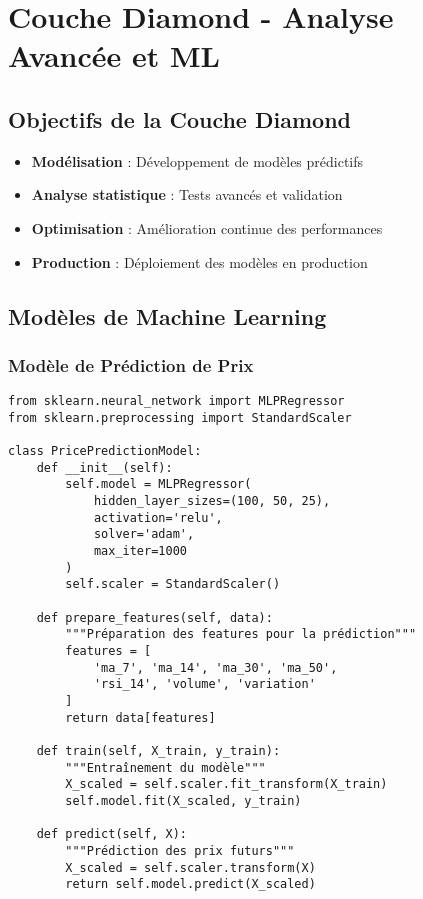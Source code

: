 \section{Couche Diamond - Analyse Avancée et ML}

\subsection{Objectifs de la Couche Diamond}

\begin{itemize}
    \item \textbf{Modélisation} : Développement de modèles prédictifs
    \item \textbf{Analyse statistique} : Tests avancés et validation
    \item \textbf{Optimisation} : Amélioration continue des performances
    \item \textbf{Production} : Déploiement des modèles en production
\end{itemize}

\subsection{Modèles de Machine Learning}

\subsubsection{Modèle de Prédiction de Prix}

\begin{verbatim}
from sklearn.neural_network import MLPRegressor
from sklearn.preprocessing import StandardScaler

class PricePredictionModel:
    def __init__(self):
        self.model = MLPRegressor(
            hidden_layer_sizes=(100, 50, 25),
            activation='relu',
            solver='adam',
            max_iter=1000
        )
        self.scaler = StandardScaler()
    
    def prepare_features(self, data):
        """Préparation des features pour la prédiction"""
        features = [
            'ma_7', 'ma_14', 'ma_30', 'ma_50',
            'rsi_14', 'volume', 'variation'
        ]
        return data[features]
    
    def train(self, X_train, y_train):
        """Entraînement du modèle"""
        X_scaled = self.scaler.fit_transform(X_train)
        self.model.fit(X_scaled, y_train)
    
    def predict(self, X):
        """Prédiction des prix futurs"""
        X_scaled = self.scaler.transform(X)
        return self.model.predict(X_scaled)
\end{verbatim}

